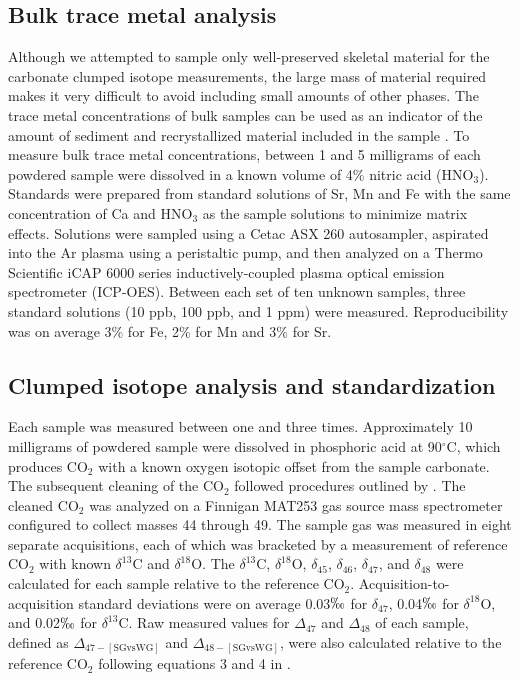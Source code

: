 \documentclass{article}
\newcommand{\deltao}{$\delta^{18}$}
\newcommand{\deltac}{$\delta^{13}$}
\newcommand{\degrees}{$^{\circ}$}
\begin{document}
\subsection{Bulk trace metal analysis}

Although we attempted to sample only well-preserved skeletal material for the carbonate clumped isotope measurements, the large mass of material required makes it very difficult to avoid including small amounts of other phases. The trace metal concentrations of bulk samples can be used as an indicator of the amount of sediment and recrystallized material included in the sample \citep{Azmy1998,Brand1980,Brand2012,Came2007,Finnegan2011,Shields2003}. To measure bulk trace metal concentrations, between 1 and 5 milligrams of each powdered sample were dissolved in a known volume of 4\% nitric acid (HNO$_3$). Standards were prepared from standard solutions of Sr, Mn and Fe with the same concentration of Ca and HNO$_3$ as the sample solutions to minimize matrix effects. Solutions were sampled using a Cetac ASX 260 autosampler, aspirated into the Ar plasma using a peristaltic pump, and then analyzed on a Thermo Scientific iCAP 6000 series inductively-coupled plasma optical emission spectrometer (ICP-OES). Between each set of ten unknown samples, three standard solutions (10 ppb, 100 ppb, and 1 ppm) were measured. Reproducibility was on average 3\% for Fe, 2\% for Mn and 3\% for Sr. 

\subsection{Clumped isotope analysis and standardization}

Each sample was measured between one and three times. Approximately 10 milligrams of powdered sample were dissolved in phosphoric acid at 90\degrees C, which produces CO$_2$ with a known oxygen isotopic offset from the sample carbonate. The subsequent cleaning of the CO$_2$ followed procedures outlined by \cite{Ghosh2006}. The cleaned CO$_2$ was analyzed on a Finnigan MAT253 gas source mass spectrometer configured to collect masses 44 through 49. The sample gas was measured in eight separate acquisitions, each of which was bracketed by a measurement of reference CO$_2$ with known \deltac C and \deltao O. The \deltac C, \deltao O, $\delta_{45}$, $\delta_{46}$, $\delta_{47}$, and $\delta_{48}$ were calculated for each sample relative to the reference CO$_2$. Acquisition-to-acquisition standard deviations were on average 0.03$\permil$ for $\delta_{47}$, 0.04$\permil$ for \deltao O, and 0.02$\permil$ for \deltac C. Raw measured values for $\Delta_{47}$ and $\Delta_{48}$ of each sample, defined as $\Delta_{47-[\text{SGvsWG}]}$ and $\Delta_{48-[\text{SGvsWG}]}$, were also calculated relative to the reference CO$_2$ following equations 3 and 4 in \cite{Huntington2009}.
\end{document}
